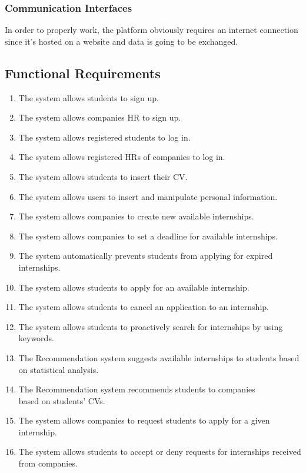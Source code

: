 \documentclass{article}
\begin{document}
\subsubsection{Communication Interfaces}

In order to properly work, the platform obviously requires an internet connection since it's hosted on a website and data is going to be exchanged.

\subsection{Functional Requirements}
\begin{enumerate}[label=R\arabic*.]
    \item The system allows students to sign up.
    \item The system allows companies HR to sign up.
    \item The system allows registered students to log in.
    \item The system allows registered HRs of companies to log in.
    \item The system allows students to insert their CV.
    \item The system allows users to insert and manipulate personal information.
    \item The system allows companies to create new available internships.
    \item The system allows companies to set a deadline for available internships.
    \item The system automatically prevents students from applying for expired internships.
    \item The system allows students to apply for an available internship.
    \item The system allows students to cancel an application to an internship.
    \item The system allows students to proactively search for internships by using keywords.
    \item The Recommendation system suggests available internships to students based on statistical analysis.
    \item The Recommendation system recommends students to companies \\ based on students' CVs.
    \item The system allows companies to request students to apply for a given internship.
    \item The system allows students to accept or deny requests for internships received from companies.

\end{enumerate}
\end{document}
